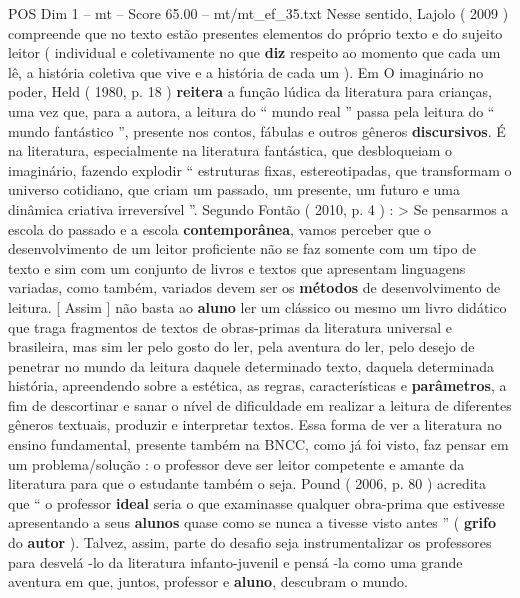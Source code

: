 \begin{textsample}{POS Dim 1 – mt – Score 65.00 – mt/mt\_ef\_35.txt}
Nesse sentido, Lajolo ( 2009 ) compreende que no texto estão presentes elementos do próprio texto e do sujeito leitor ( individual e coletivamente no que \textbf{diz} respeito ao momento que cada um lê, a história coletiva que vive e a história de cada um ).
Em O imaginário no poder, Held ( 1980, p. 18 ) \textbf{reitera} a função lúdica da literatura para crianças, uma vez que, para a autora, a leitura do “ mundo real ” passa pela leitura do “ mundo fantástico ”, presente nos contos, fábulas e outros gêneros \textbf{discursivos}.
É na literatura, especialmente na literatura fantástica, que desbloqueiam o imaginário, fazendo explodir “ estruturas fixas, estereotipadas, que transformam o universo cotidiano, que criam um passado, um presente, um futuro e uma dinâmica criativa irreversível ”.
Segundo Fontão ( 2010, p. 4 ) : > Se pensarmos a escola do passado e a escola \textbf{contemporânea}, vamos perceber que o desenvolvimento de um leitor proficiente não se faz somente com um tipo de texto e sim com um conjunto de livros e textos que apresentam linguagens variadas, como também, variados devem ser os \textbf{métodos} de desenvolvimento de leitura. [ Assim ] não basta ao \textbf{aluno} ler um clássico ou mesmo um livro didático que traga fragmentos de textos de obras-primas da literatura universal e brasileira, mas sim ler pelo gosto do ler, pela aventura do ler, pelo desejo de penetrar no mundo da leitura daquele determinado texto, daquela determinada história, apreendendo sobre a estética, as regras, características e \textbf{parâmetros}, a fim de descortinar e sanar o nível de dificuldade em realizar a leitura de diferentes gêneros textuais, produzir e interpretar textos.
Essa forma de ver a literatura no ensino fundamental, presente também na BNCC, como já foi visto, faz pensar em um problema/solução : o professor deve ser leitor competente e amante da literatura para que o estudante também o seja.
Pound ( 2006, p. 80 ) acredita que “ o professor \textbf{ideal} seria o que examinasse qualquer obra-prima que estivesse apresentando a seus \textbf{alunos} quase como se nunca a tivesse visto antes ” ( \textbf{grifo} do \textbf{autor} ).
Talvez, assim, parte do desafio seja instrumentalizar os professores para desvelá -lo da literatura infanto-juvenil e pensá -la como uma grande aventura em que, juntos, professor e \textbf{aluno}, descubram o mundo.

\end{textsample}
